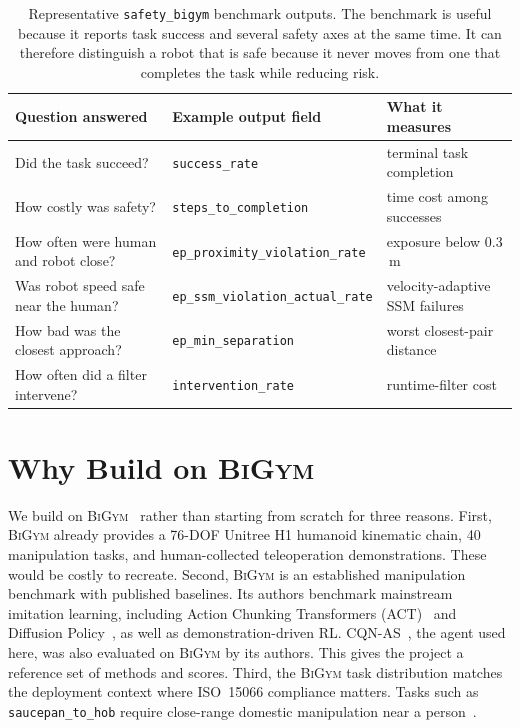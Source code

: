 \documentclass[11pt,a4paper]{report}
\newcommand{\ssm}{SSM}
\newcommand{\iso}{ISO~15066}
\newcommand{\bigym}{\textsc{BiGym}}
\newcommand{\sbigym}{\texttt{safety\_bigym}}
\newcommand{\cqnas}{CQN-AS}
\begin{document}
\begin{table}[htbp]
\centering
\small
\caption{Representative \sbigym{} benchmark outputs. The benchmark is
useful because it reports task success and several safety axes at the
same time. It can therefore distinguish a robot that is safe because it
never moves from one that completes the task while reducing risk.}
\label{tab:benchmark-output}
\begin{tabular}{lll}
\toprule
Question answered & Example output field & What it measures \\
\midrule
Did the task succeed? & \texttt{success\_rate} & terminal task completion \\
How costly was safety? & \texttt{steps\_to\_completion} & time cost among successes \\
How often were human and robot close? & \texttt{ep\_proximity\_violation\_rate} & exposure below $0.3$\,m \\
Was robot speed safe near the human? & \texttt{ep\_ssm\_violation\_actual\_rate} & velocity-adaptive \ssm{} failures \\
How bad was the closest approach? & \texttt{ep\_min\_separation} & worst closest-pair distance \\
How often did a filter intervene? & \texttt{intervention\_rate} & runtime-filter cost \\
\bottomrule
\end{tabular}
\end{table}

\section{Why Build on \bigym{}}
\label{sec:bench:why-bigym}

We build on \bigym{}~\cite{chernyadev2024bigym} rather than starting
from scratch for three reasons. First, \bigym{} already provides a
76-DOF Unitree H1 humanoid kinematic chain, 40 manipulation tasks, and
human-collected teleoperation demonstrations. These would be costly to
recreate. Second, \bigym{} is an established manipulation benchmark
with published baselines. Its authors benchmark mainstream imitation
learning, including Action Chunking Transformers
(ACT)~\cite{zhao2023act} and Diffusion
Policy~\cite{chi2023diffusion}, as well as demonstration-driven RL.
\cqnas{}~\cite{seo2024cqnas}, the agent used here, was also evaluated
on \bigym{} by its authors. This gives the project a reference set of
methods and scores. Third, the \bigym{} task distribution matches the
deployment context where \iso{} compliance matters. Tasks such as
\texttt{saucepan\_to\_hob} require close-range domestic manipulation
near a person~\cite{chernyadev2024bigym}.
\end{document}
